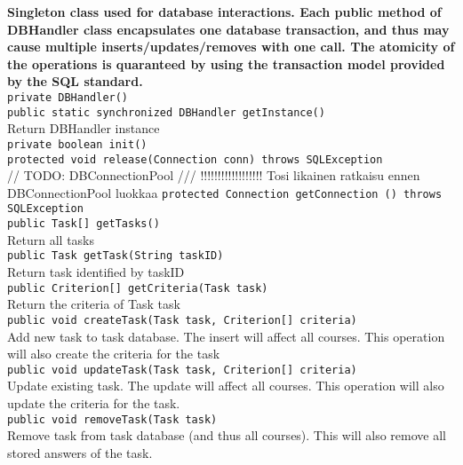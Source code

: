 {\bf Singleton class used for database interactions. Each public method of DBHandler class
encapsulates one database transaction, and thus may cause multiple inserts/updates/removes
with one call. The atomicity of the operations is quaranteed by using the transaction model
provided by the SQL standard.} \\
    
{\tt 		private DBHandler()} \\

{\tt 		public static synchronized DBHandler getInstance()} \\
Return DBHandler instance\\
	
{\tt 		private boolean init()} \\
	
{\tt 		protected void release(Connection conn) throws SQLException} \\

	// TODO: DBConnectionPool
	///      !!!!!!!!!!!!!!!!!! Tosi likainen ratkaisu ennen DBConnectionPool luokkaa
{\tt 		protected Connection getConnection () throws SQLException} \\

		
{\tt 		public Task[] getTasks()} \\
Return all tasks\\
	
{\tt 		public Task getTask(String taskID)} \\
Return task identified by taskID\\

{\tt		public Criterion[] getCriteria(Task task)}\\
Return the criteria of Task task\\
	
{\tt 		public void createTask(Task task, Criterion[] criteria)} \\
Add new task to task database. The insert will affect all courses. This operation
will also create the criteria for the task\\
	
{\tt 		public void updateTask(Task task, Criterion[] criteria)} \\
Update existing task. The update will affect all courses. This operation
will also update the criteria for the task.\\

{\tt 		public void removeTask(Task task)} \\
Remove task from task database (and thus all courses). This will also remove all stored
answers of the task.\\

